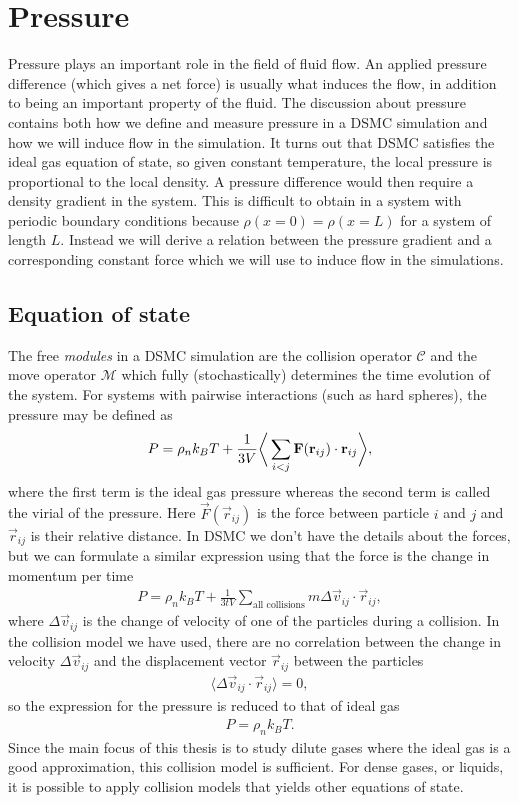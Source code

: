 \section{Pressure}
\label{sec:dsmc_pressure}
Pressure plays an important role in the field of fluid flow. An applied pressure difference (which gives a net force) is usually what induces the flow, in addition to being an important property of the fluid. The discussion about pressure contains both how we define and measure pressure in a DSMC simulation and how we will induce flow in the simulation. It turns out that DSMC satisfies the ideal gas equation of state, so given constant temperature, the local pressure is proportional to the local density. A pressure difference would then require a density gradient in the system. This is difficult to obtain in a system with periodic boundary conditions because $\rho(x=0) = \rho(x=L)$ for a system of length $L$. Instead we will derive a relation between the pressure gradient and a corresponding constant force which we will use to induce flow in the simulations.
\subsection{Equation of state}
\label{sec:dsmc_eos}
The free \textit{modules} in a DSMC simulation are the collision operator $\mathcal C$ and the move operator $\mathcal M$ which fully (stochastically) determines the time evolution of the system. For systems with pairwise interactions (such as hard spheres), the pressure may be defined as\cite{frenkel2001understanding}
\begin{align}
	P = \rho_nk_BT + {1\over 3V}\bigg\langle \sum_{i<j} \vec F(\vec r_{ij})\cdot \vec r_{ij}\bigg\rangle,
\end{align}
where the first term is the ideal gas pressure whereas the second term is called the virial of the pressure. Here $\vec F(\vec r_{ij})$ is the force between particle $i$ and $j$ and $\vec r_{ij}$ is their relative distance. In DSMC we don't have the details about the forces, but we can formulate a similar expression using that the force is the change in momentum per time
\begin{align}
	P = \rho_nk_BT + \frac{1}{3tV}\sum_\text{all collisions} m\Delta \vec v_{ij}\cdot \vec r_{ij},
\end{align}
where $\Delta \vec v_{ij}$ is the change of velocity of one of the particles during a collision\cite{garcia1997direct}. In the collision model we have used, there are no correlation between the change in velocity $\Delta \vec v_{ij}$ and the displacement vector $\vec r_{ij}$ between the particles
\begin{align}
	\langle \Delta \vec v_{ij}\cdot \vec r_{ij}\rangle = 0,
\end{align}
so the expression for the pressure is reduced to that of ideal gas
\begin{align}
	P = \rho_n k_BT.
\end{align}
Since the main focus of this thesis is to study dilute gases where the ideal gas is a good approximation, this collision model is sufficient. For dense gases, or liquids, it is possible to apply collision models that yields other equations of state.
